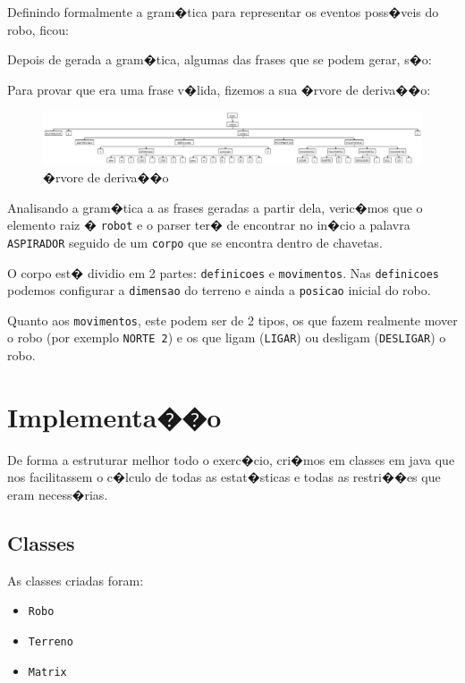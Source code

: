\documentclass[a4paper]{article}
\begin{document}
Definindo formalmente a gram�tica para representar os eventos poss�veis do robo, ficou:


Depois de gerada a gram�tica, algumas das frases que se podem gerar, s�o:

Para provar que era uma frase v�lida, fizemos a sua �rvore de deriva��o:
\begin{figure}[H]
 \centering
 \includegraphics[scale=0.29]{arv1.jpeg}
 \caption{�rvore de deriva��o}
\end{figure}


Analisando a gram�tica a as frases geradas a partir dela, veric�mos que o elemento raiz � \verb|robot| e o parser ter� de encontrar no in�cio a palavra \verb|ASPIRADOR| seguido de um \verb|corpo| que se encontra dentro de chavetas.

O corpo est� dividio em 2 partes: \verb|definicoes| e \verb|movimentos|. Nas \verb|definicoes| podemos configurar a \verb|dimensao| do terreno e ainda a \verb|posicao| inicial do robo.

Quanto aos \verb|movimentos|, este podem ser de 2 tipos, os que fazem realmente mover o robo (por exemplo \verb|NORTE 2|) e os que ligam (\verb|LIGAR|) ou desligam (\verb|DESLIGAR|) o robo. 

\section{Implementa��o}
De forma a estruturar melhor todo o exerc�cio, cri�mos em classes em java que nos facilitassem o c�lculo de todas as estat�sticas e todas as restri��es que eram necess�rias.

\subsection{Classes}
As classes criadas foram:
\begin{itemize}
	\item \verb|Robo|
	\item \verb|Terreno|
	\item \verb|Matrix|
\end{itemize}
\end{document}
